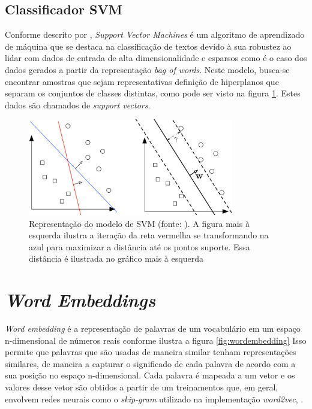 \subsection{Classificador SVM}
\label{theoretical_SVM}
Conforme descrito por \cite{SVM4textClassification}, \textit{Support Vector Machines} é um algoritmo de aprendizado de máquina que se destaca na classificação de textos devido à sua robustez ao lidar com dados de entrada de alta dimensionalidade e esparsos como é o caso dos dados gerados a partir da representação \textit{bag of words}. Neste modelo, busca-se encontrar amostras que sejam representativas definição de hiperplanos que separam os conjuntos de classes distintas, como pode ser visto na figura \ref{fig:theorical_SVM}. Estes dados são chamados de \textit{support vectors}.

\begin{figure}[!ht]
	\centering
	\includegraphics[width=0.8\textwidth]{figures/theorical_SVM.png}
	\caption{Representação do modelo de SVM (fonte: \cite{SVM_Weinberger}). A figura mais à esquerda ilustra a iteração da reta vermelha se transformando na azul para maximizar a distância até os pontos suporte. Essa distância é ilustrada no gráfico mais à esquerda}
	\label{fig:theorical_SVM}
\end{figure}

\section{\textit{Word Embeddings}}

\textit{Word embedding} é a representação de palavras de um vocabulário em um espaço n-dimensional de números reais conforme ilustra a figura \ref{fig:wordembedding} Isso permite que palavras que são usadas de maneira similar tenham representações similares, de maneira a capturar o significado de cada palavra de acordo com a sua posição no espaço n-dimensional. Cada palavra é mapeada a um vetor e os valores desse vetor são obtidos a partir de um treinamentos que, em geral, envolvem redes neurais como o \textit{skip-gram} utilizado na implementação \textit{word2vec}, \cite{DBLP:journals/corr/MikolovSCCD13}.

